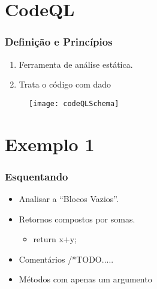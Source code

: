 \documentclass[10pt, aspectratio=169]{beamer}
\begin{document}
\section{CodeQL}
\begin{frame}
  \frametitle{Definição e Princípios} 

  \begin{enumerate}
  \item \vfill Ferramenta de análise estática.
  \item \vfill Trata o código com dado
  \end{enumerate}
\begin{figure} 
	
	\texttt{[image: codeQLSchema]}

\end{figure}
	
 


\end{frame}


\section{Exemplo 1}
\begin{frame}
	\frametitle{Esquentando}
	  \begin{itemize}
		\item  Analisar a ``Blocos Vazios''.
		\item  Retornos compostos por somas.
		\begin{itemize}
			\item return x+y;	
		\end{itemize}
		\item Comentários /*TODO.....
		\item Métodos com apenas um argumento
		
	\end{itemize}
	
	
	
\end{frame}
\end{document}
